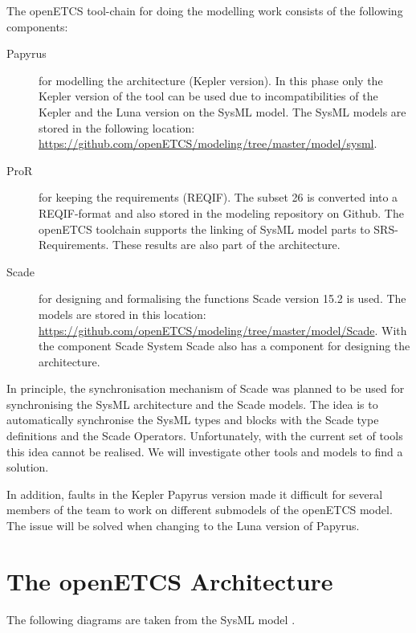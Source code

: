 \documentclass{template/openetcs_report}
\begin{document}
The openETCS tool-chain for doing the modelling work consists of the following components:
\begin{description}
	\item[Papyrus] for modelling the architecture (Kepler version).
	In this phase only the Kepler version of the tool can be used due to incompatibilities of the Kepler and the Luna version on the SysML model. The SysML models are stored in the following location: \url{https://github.com/openETCS/modeling/tree/master/model/sysml}.
	\item[ProR] for keeping the requirements (REQIF).
	The subset 26 is converted into a REQIF-format and also stored in the modeling repository on Github. The openETCS toolchain supports the linking of SysML model parts to SRS-Requirements. These results are also part of the architecture.
	\item[Scade] for designing and formalising the functions Scade version 15.2 is used.
	The models are stored in this location: \url{https://github.com/openETCS/modeling/tree/master/model/Scade}.
	With the component Scade System Scade also has a component for designing the architecture.
\end{description}

In principle, the synchronisation mechanism of Scade was planned to be used for synchronising the SysML architecture and the Scade models. The idea is to automatically synchronise the SysML types and blocks with the Scade type definitions and the Scade Operators. Unfortunately, with the current set of tools this idea cannot be realised. We will investigate other tools and models to find a solution. 

In addition, faults in the Kepler Papyrus version made it difficult for several members of the team to work on different submodels of the openETCS model. The issue will be solved when changing to the Luna version of Papyrus.



\section{The openETCS Architecture}

The following diagrams are taken from the SysML model \cite{sysml-model}.
\end{document}
